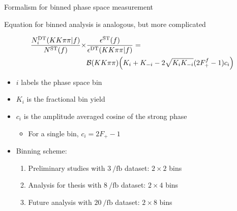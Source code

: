 \documentclass{beamer}
\begin{document}
\begin{frame}{Formalism for binned phase space measurement}
  \begin{center}
    Equation for binned analysis is analogous, but more complicated
  \end{center}
  \begin{align*}
    \frac{N_i^{\rm DT}(KK\pi\pi | f)}{N^{\rm ST}(f)}\times&\frac{\epsilon^{\rm ST}(f)}{\epsilon^{\rm DT}(KK\pi\pi | f)} =\\
    &\mathcal{B}(KK\pi\pi)\Big(K_i + K_{-i} - 2\sqrt{K_iK_{-i}}(2F_+^f - 1)c_i\Big)
  \end{align*}
  \vspace{-0.7cm}
  \begin{itemize}
    \item{$i$ labels the phase space bin}
    \item{$K_i$ is the fractional bin yield}
    \item{$c_i$ is the amplitude averaged cosine of the strong phase}
    \begin{itemize}
      \item{For a single bin, $c_i = 2F_+ - 1$}
    \end{itemize}
    \item{Binning scheme:}
    \begin{enumerate}
      \item{Preliminary studies with $\SI{3}{\per\femto\barn}$ dataset: $2\times2$ bins}
      \item{Analysis for thesis with $\SI{8}{\per\femto\barn}$ dataset: $2\times4$ bins}
      \item{Future analysis with $\SI{20}{\per\femto\barn}$ dataset: $2\times8$ bins}
    \end{enumerate}
  \end{itemize}
\end{frame}
\end{document}
